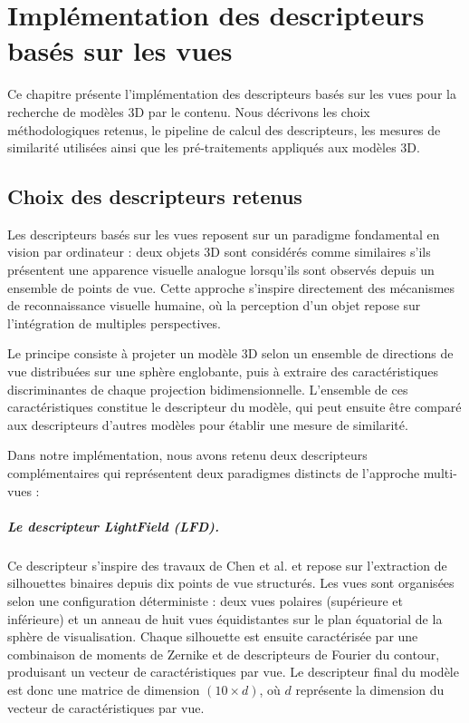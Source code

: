 \documentclass[11pt,a4paper,oneside]{report}
\begin{document}

\chapter{Implémentation des descripteurs basés sur les vues}

Ce chapitre présente l'implémentation des descripteurs basés sur les vues pour la recherche de modèles 3D par le contenu. Nous décrivons les choix méthodologiques retenus, le pipeline de calcul des descripteurs, les mesures de similarité utilisées ainsi que les pré-traitements appliqués aux modèles 3D.

\section{Choix des descripteurs retenus}

Les descripteurs basés sur les vues reposent sur un paradigme fondamental en vision par ordinateur : deux objets 3D sont considérés comme similaires s'ils présentent une apparence visuelle analogue lorsqu'ils sont observés depuis un ensemble de points de vue. Cette approche s'inspire directement des mécanismes de reconnaissance visuelle humaine, où la perception d'un objet repose sur l'intégration de multiples perspectives.

Le principe consiste à projeter un modèle 3D selon un ensemble de directions de vue distribuées sur une sphère englobante, puis à extraire des caractéristiques discriminantes de chaque projection bidimensionnelle. L'ensemble de ces caractéristiques constitue le descripteur du modèle, qui peut ensuite être comparé aux descripteurs d'autres modèles pour établir une mesure de similarité.

Dans notre implémentation, nous avons retenu deux descripteurs complémentaires qui représentent deux paradigmes distincts de l'approche multi-vues :

\paragraph{Le descripteur LightField (LFD).} Ce descripteur s'inspire des travaux de Chen et al. et repose sur l'extraction de silhouettes binaires depuis dix points de vue structurés. Les vues sont organisées selon une configuration déterministe : deux vues polaires (supérieure et inférieure) et un anneau de huit vues équidistantes sur le plan équatorial de la sphère de visualisation. Chaque silhouette est ensuite caractérisée par une combinaison de moments de Zernike et de descripteurs de Fourier du contour, produisant un vecteur de caractéristiques par vue. Le descripteur final du modèle est donc une matrice de dimension $(10 \times d)$, où $d$ représente la dimension du vecteur de caractéristiques par vue.
\end{document}
